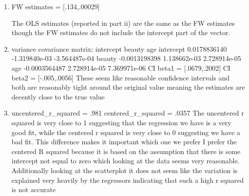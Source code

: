 \documentclass{article}
\begin{document}
\begin{enumerate}
\begin{enumerate}
				\item 
				FW estimates = [.134,.00029] \newline
				
				The OLS estimates (reported in part ii) are the same as the FW estimates though the FW estimates do not include the intercept part of the vector.
				\item 
				variance covariance matrix:
				\newline
				              intercept        beauty           age\newline
				              intercept  0.0178836140 -1.319840e-03 -3.564487e-04\newline
				              beauty    -0.0013198398  1.138662e-03  2.728914e-05\newline
				              age       -0.0003564487  2.728914e-05  7.369971e-06\newline
	            \newline
	            CI beta1 = [.0679,.2002] \newline
	            CI beta2 = [-.005,.0056] \newline
	            \newline
	            These seem like reasonable confidence intervals and both are reasonably tight around the original value meaning the estimates are decently close to the true value
				\item
				uncentered\_r\_squared = .981   \newline
				centered\_r\_squared = .0357  \newline
				\newline
				The uncentered r squared is very close to 1 suggesting that the regression we have is a very good fit, while the centered r squared is very close to 0 suggesting we have a bad fit. This difference makes it important which one we prefer \newline
				\newline
				I prefer the centered R squared because it is based on the assumption that there is some intercept not equal to zero which looking at the data seems very reasonable. Additionally looking at the scatterplot it does not seem like the variation is explained very heavily by the regressors indicating that such a high r squared is not accurate
				

\end{enumerate}
\end{enumerate}
\end{document}

